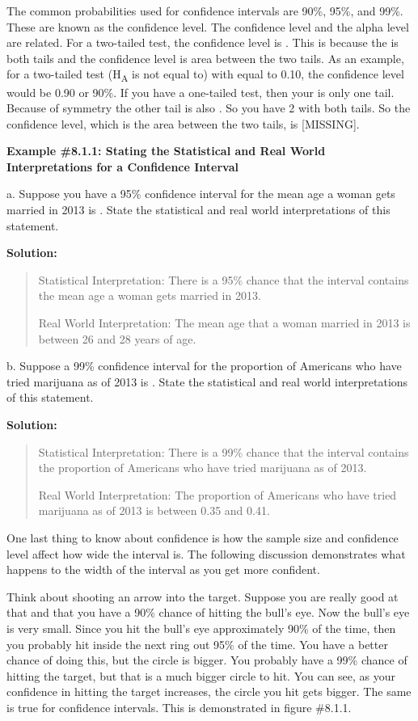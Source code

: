 \documentclass[]{book}
\begin{document}
The common probabilities used for confidence intervals are 90\%, 95\%, and 99\%. These are known as the confidence level. The confidence level and the alpha level are related. For a two-tailed test, the confidence level is . This is because the is both tails and the confidence level is area between the two tails. As an example, for a two-tailed test (H\textsubscript{A} is not equal to) with equal to 0.10, the confidence level would be 0.90 or 90\%. If you have a one-tailed test, then your is only one tail. Because of symmetry the other tail is also . So you have 2 with both tails. So the confidence level, which is the area between the two tails, is {[}MISSING{]}.

\textbf{Example \#8.1.1: Stating the Statistical and Real World
Interpretations for a Confidence Interval}

a. Suppose you have a 95\% confidence interval for the mean age a woman
gets married in 2013 is . State the statistical and real world
interpretations of this statement.

\textbf{Solution:}

\begin{quote}
Statistical Interpretation: There is a 95\% chance that the interval
contains the mean age a woman gets married in 2013.

Real World Interpretation: The mean age that a woman married in 2013
is between 26 and 28 years of age.
\end{quote}

b. Suppose a 99\% confidence interval for the proportion of Americans who
have tried marijuana as of 2013 is . State the statistical and real
world interpretations of this statement.

\textbf{Solution:}

\begin{quote}
Statistical Interpretation: There is a 99\% chance that the interval
contains the proportion of Americans who have tried marijuana as of
2013.

Real World Interpretation: The proportion of Americans who have tried
marijuana as of 2013 is between 0.35 and 0.41.
\end{quote}

One last thing to know about confidence is how the sample size and
confidence level affect how wide the interval is. The following
discussion demonstrates what happens to the width of the interval as you
get more confident.

Think about shooting an arrow into the target. Suppose you are really
good at that and that you have a 90\% chance of hitting the bull's eye.
Now the bull's eye is very small. Since you hit the bull's eye
approximately 90\% of the time, then you probably hit inside the next
ring out 95\% of the time. You have a better chance of doing this, but
the circle is bigger. You probably have a 99\% chance of hitting the
target, but that is a much bigger circle to hit. You can see, as your
confidence in hitting the target increases, the circle you hit gets
bigger. The same is true for confidence intervals. This is demonstrated
in figure \#8.1.1.
\end{document}
